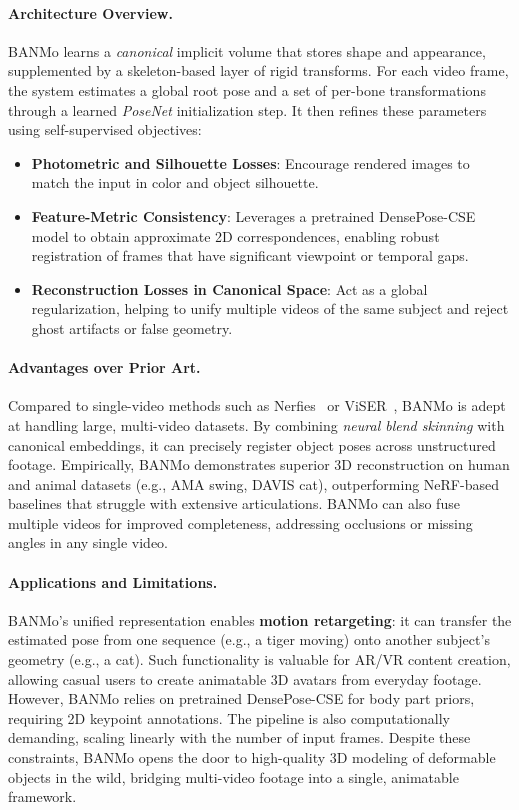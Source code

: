 \documentclass[11pt]{article}
\begin{document}
\paragraph{Architecture Overview.}
BANMo learns a \emph{canonical} implicit volume that stores shape and appearance, supplemented by a skeleton-based layer of rigid transforms. For each video frame, the system estimates a global root pose and a set of per-bone transformations through a learned \textit{PoseNet} initialization step. It then refines these parameters using self-supervised objectives:
\begin{itemize}
    \item \textbf{Photometric and Silhouette Losses}: Encourage rendered images to match the input in color and object silhouette.
    \item \textbf{Feature-Metric Consistency}: Leverages a pretrained DensePose-CSE model to obtain approximate 2D correspondences, enabling robust registration of frames that have significant viewpoint or temporal gaps.
    \item \textbf{Reconstruction Losses in Canonical Space}: Act as a global regularization, helping to unify multiple videos of the same subject and reject ghost artifacts or false geometry.
\end{itemize}

\paragraph{Advantages over Prior Art.}
Compared to single-video methods such as Nerfies~\cite{park2021nerfies} or ViSER~\cite{yang2021viser}, BANMo is adept at handling large, multi-video datasets. By combining \emph{neural blend skinning} with canonical embeddings, it can precisely register object poses across unstructured footage. Empirically, BANMo demonstrates superior 3D reconstruction on human and animal datasets (e.g., AMA swing, DAVIS cat), outperforming NeRF-based baselines that struggle with extensive articulations. BANMo can also fuse multiple videos for improved completeness, addressing occlusions or missing angles in any single video.

\paragraph{Applications and Limitations.}
BANMo’s unified representation enables \textbf{motion retargeting}: it can transfer the estimated pose from one sequence (e.g., a tiger moving) onto another subject’s geometry (e.g., a cat). Such functionality is valuable for AR/VR content creation, allowing casual users to create animatable 3D avatars from everyday footage. However, BANMo relies on pretrained DensePose-CSE for body part priors, requiring 2D keypoint annotations. The pipeline is also computationally demanding, scaling linearly with the number of input frames. Despite these constraints, BANMo opens the door to high-quality 3D modeling of deformable objects in the wild, bridging multi-video footage into a single, animatable framework.
\end{document}
